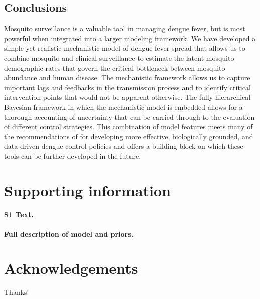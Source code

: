\documentclass[10pt,letterpaper]{article}
\begin{document}
\subsection*{Conclusions}

Mosquito surveillance is a valuable tool in managing dengue fever, but is most powerful when integrated into a larger modeling framework.
We have developed a simple yet realistic mechanistic model of dengue fever spread that allows us to combine mosquito and clinical surveillance to estimate the latent mosquito demographic rates that govern the critical bottleneck between mosquito abundance and human disease.
The mechanistic framework allows us to capture important lags and feedbacks in the transmission process and to identify critical intervention points that would not be apparent otherwise.
The fully hierarchical Bayesian framework in which the mechanistic model is embedded allows for a thorough accounting of uncertainty that can be carried through to the evaluation of different control strategies.
This combination of model features meets many of the recommendations of \cite{Morrison2008, Achee2015} for developing more effective, biologically grounded, and data-driven dengue control policies and offers a building block on which these tools can be further developed in the future.

\section*{Supporting information}

\paragraph*{S1 Text.}
\label{S1_Diag}
{\bf Full description of model and priors.}

\section*{Acknowledgements}

Thanks!

\nolinenumbers

%
%
% 



\end{document}
